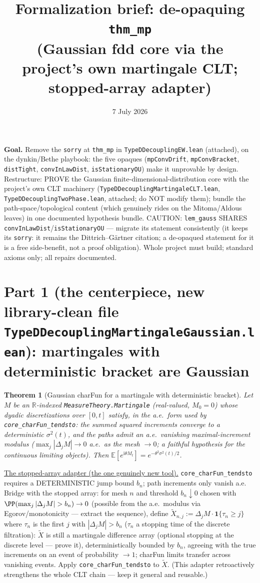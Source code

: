 \documentclass[11pt]{article}
\title{Formalization brief: de-opaquing \texttt{thm\_mp}\\
(Gaussian fdd core via the project's own martingale CLT; stopped-array
adapter)}
\date{7 July 2026}
\theoremstyle{plain}
\newtheorem{theorem}{Theorem}
\theoremstyle{remark}
\newcommand{\E}{\mathbb{E}}\newcommand{\R}{\mathbb{R}}
\begin{document}
\maketitle

\noindent\textbf{Goal.} Remove the \texttt{sorry} at \texttt{thm\_mp} in
\texttt{TypeDDecouplingEW.lean} (attached), on the dynkin/Bethe playbook: the
five opaques (\texttt{mpConvDrift}, \texttt{mpConvBracket},
\texttt{distTight}, \texttt{convInLawDist}, \texttt{isStationaryOU}) make it
unprovable by design. Restructure: PROVE the Gaussian
finite-dimensional-distribution core with the project's own CLT machinery
(\texttt{TypeDDecouplingMartingaleCLT.lean},
\texttt{TypeDDecouplingTwoPhase.lean}, attached; do NOT modify them); bundle
the path-space/topological content (which genuinely rides on the Mitoma/Aldous
leaves) in one documented hypothesis bundle. CAUTION:
\texttt{lem\_gauss} SHARES \texttt{convInLawDist}/\texttt{isStationaryOU} ---
migrate its statement consistently (it keeps its \texttt{sorry}: it remains
the Dittrich--G\"artner citation; a de-opaqued statement for it is a free
side-benefit, not a proof obligation). Whole project must build; standard
axioms only; all repairs documented.

\section*{Part 1 (the centerpiece, new library-clean file
\texttt{TypeDDecouplingMartingaleGaussian.lean}): martingales with
deterministic bracket are Gaussian}

\begin{theorem}[Gaussian charFun for a martingale with deterministic bracket]
Let $M$ be an $\R$-indexed \texttt{MeasureTheory.Martingale} (real-valued,
$M_0=0$) whose dyadic discretizations over $[0,t]$ satisfy, in the a.e.\
form used by \texttt{core\_charFun\_tendsto}: the summed squared increments
converge to a deterministic $\sigma^2(t)$, and the paths admit an a.e.\
vanishing maximal-increment modulus ($\max_j|\Delta_jM|\to0$ a.e.\ as the
mesh $\to0$; a faithful hypothesis for the continuous limiting objects).
Then $\E[e^{\mathrm i\theta M_t}]=e^{-\theta^2\sigma^2(t)/2}$.
\end{theorem}

\noindent\underline{The stopped-array adapter (the one genuinely new tool).}
\texttt{core\_charFun\_tendsto} requires a DETERMINISTIC jump bound $b_n$;
path increments only vanish a.e. Bridge with the stopped array: for mesh $n$
and threshold $b_n\downarrow0$ chosen with
$\PP(\max_j|\Delta_jM|>b_n)\to0$ (possible from the a.e.\ modulus via
Egorov/monotonicity --- extract the sequence), define
$\tilde X_{n,j}:=\Delta_jM\cdot\mathbf 1\{\tau_n\ge j\}$ where $\tau_n$ is
the first $j$ with $|\Delta_jM|>b_n$ ($\tau_n$ a stopping time of the
discrete filtration): $\tilde X$ is still a martingale difference array
(optional stopping at the discrete level --- prove it), deterministically
bounded by $b_n$, agreeing with the true increments on an event of
probability $\to1$; charFun limits transfer across vanishing events. Apply
\texttt{core\_charFun\_tendsto} to $\tilde X$. (This adapter retroactively
strengthens the whole CLT chain --- keep it general and reusable.)
\end{document}

